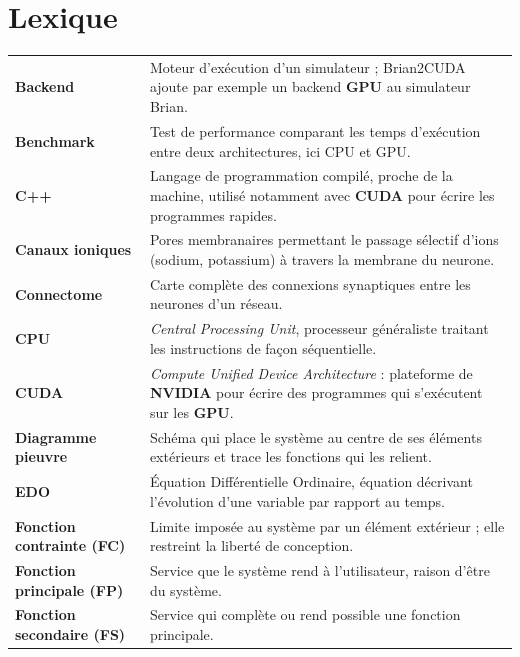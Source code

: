 \documentclass{report}
\title{\DocName}
\author{\DocAuthors}
\date{\textbf{JUNIA - ISEN - AP4} \url{https://github.com/CharlesBta/Modele-Neuronaux-RD.git}}
\begin{document}
\maketitle

\chapter*{Lexique}

\medskip
\begin{longtable}{@{}p{3.9cm}p{11cm}@{}}
    \textbf{Backend} & Moteur d'exécution d'un simulateur ; Brian2CUDA ajoute par exemple un backend \textbf{GPU} au simulateur Brian. \\[6pt]
    \textbf{Benchmark} & Test de performance comparant les temps d'exécution entre deux architectures, ici CPU et GPU. \\[6pt]
    \textbf{C++} & Langage de programmation compilé, proche de la machine, utilisé notamment avec \textbf{CUDA} pour écrire les programmes rapides. \\[6pt]
    \textbf{Canaux ioniques} & Pores membranaires permettant le passage sélectif d'ions (sodium, potassium) à travers la membrane du neurone. \\[6pt]
    \textbf{Connectome} & Carte complète des connexions synaptiques entre les neurones d'un réseau. \\[6pt]
    \textbf{CPU} & \textit{Central Processing Unit}, processeur généraliste traitant les instructions de façon séquentielle. \\[6pt]
    \textbf{CUDA} & \emph{Compute Unified Device Architecture} : plateforme de \textbf{NVIDIA} pour écrire des programmes qui s'exécutent sur les \textbf{GPU}. \\[6pt]
    \textbf{Diagramme pieuvre} & Schéma qui place le système au centre de ses éléments extérieurs et trace les fonctions qui les relient. \\[6pt]
    \textbf{EDO} & Équation Différentielle Ordinaire, équation décrivant l'évolution d'une variable par rapport au temps. \\[6pt]
    \textbf{Fonction contrainte (FC)} & Limite imposée au système par un élément extérieur ; elle restreint la liberté de conception. \\[6pt]
    \textbf{Fonction principale (FP)} & Service que le système rend à l'utilisateur, raison d'être du système. \\[6pt]
    \textbf{Fonction secondaire (FS)} & Service qui complète ou rend possible une fonction principale. \\[6pt]

\end{longtable}
\end{document}
